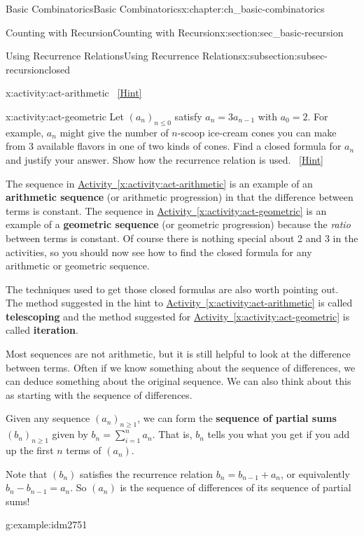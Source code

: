 \documentclass[oneside,10pt,]{book}
\newcommand{\terminology}[1]{\textbf{#1}}
\numberwithin{equation}{chapter}
\begin{document}
\begin{chapterptx}{Basic Combinatorics}{}{Basic Combinatorics}{}{}{x:chapter:ch_basic-combinatorics}
\begin{sectionptx}{Counting with Recursion}{}{Counting with Recursion}{}{}{x:section:sec_basic-recursion}
\begin{subsectionptx}{Using Recurrence Relations}{}{Using Recurrence Relations}{}{}{x:subsection:subsec-recursionclosed}
\begin{activity}{}{x:activity:act-arithmetic}
\qquad~\hfill{\tiny\hyperlink{g:hint:idm2707-back}{[Hint]}}\end{activity}
\begin{activity}{}{x:activity:act-geometric}%
Let \((a_n)_{n \le 0}\) satisfy \(a_n = 3a_{n-1}\) with \(a_0 = 2\).  For example, \(a_n\) might give the number of \(n\)-scoop ice-cream cones you can make from 3 available flavors in one of two kinds of cones.  Find a closed formula for \(a_n\) and justify your answer.  Show how the recurrence relation is used.%
\qquad~\hfill{\tiny\hyperlink{g:hint:idm2721-back}{[Hint]}}\end{activity}
The sequence in \hyperref[x:activity:act-arithmetic]{Activity~\ref{x:activity:act-arithmetic}} is an example of an \terminology{arithmetic sequence} (or arithmetic progression) in that the difference between terms is constant.  The sequence in \hyperref[x:activity:act-geometric]{Activity~\ref{x:activity:act-geometric}} is an example of a \terminology{geometric sequence} (or geometric progression) because the \emph{ratio} between terms is constant.  Of course there is nothing special about 2 and 3 in the activities, so you should now see how to find the closed formula for any arithmetic or geometric sequence.%
\par
The techniques used to get those closed formulas are also worth pointing out.  The method suggested in the hint to \hyperref[x:activity:act-arithmetic]{Activity~\ref{x:activity:act-arithmetic}} is called \terminology{telescoping} and the method suggested for \hyperref[x:activity:act-geometric]{Activity~\ref{x:activity:act-geometric}} is called \terminology{iteration}.%
\par
Most sequences are not arithmetic, but it is still helpful to look at the difference between terms.  Often if we know something about the sequence of differences, we can deduce something about the original sequence.   We can also think about this as starting with the sequence of differences.%
\par
Given any sequence \((a_n)_{n \ge 1}\), we can form the \terminology{sequence of partial sums} \((b_n)_{n \ge 1}\) given by \(b_n = \sum_{i = 1}^n a_n\).  That is, \(b_n\) tells you what you get if you add up the first \(n\) terms of \((a_n)\).%
\par
Note that \((b_n)\) satisfies the recurrence relation \(b_n = b_{n-1} + a_n\), or equivalently \(b_n - b_{n-1} = a_n\).  So \((a_n)\) is the sequence of differences of its sequence of partial sums!%
\begin{example}{}{g:example:idm2751}%

\end{example}
\end{subsectionptx}
\end{sectionptx}
\end{chapterptx}
\end{document}
